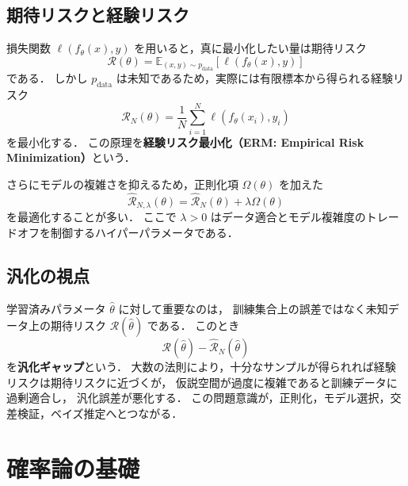 \subsection{期待リスクと経験リスク}

損失関数 $\ell(f_{\theta}(x), y)$ を用いると，真に最小化したい量は期待リスク
\begin{equation}
  \mathcal{R}(\theta)
  =
  \mathbb{E}_{(x,y)\sim p_{\mathrm{data}}}
  \left[
    \ell(f_{\theta}(x), y)
  \right]
  \label{eq:true-risk}
\end{equation}
である．
しかし $p_{\mathrm{data}}$ は未知であるため，実際には有限標本から得られる経験リスク
\begin{equation}
  \hat{\mathcal{R}}_{N}(\theta)
  =
  \frac{1}{N}
  \sum_{i=1}^{N}
  \ell(f_{\theta}(x_i), y_i)
  \label{eq:empirical-risk}
\end{equation}
を最小化する．
この原理を\textbf{経験リスク最小化（ERM: Empirical Risk Minimization）}という．

さらにモデルの複雑さを抑えるため，正則化項 $\Omega(\theta)$ を加えた
\begin{equation}
  \hat{\mathcal{R}}_{N,\lambda}(\theta)
  =
  \hat{\mathcal{R}}_{N}(\theta) + \lambda \Omega(\theta)
  \label{eq:regularized-risk}
\end{equation}
を最適化することが多い．
ここで $\lambda > 0$ はデータ適合とモデル複雑度のトレードオフを制御するハイパーパラメータである．

\subsection{汎化の視点}

学習済みパラメータ $\hat{\theta}$ に対して重要なのは，
訓練集合上の誤差ではなく未知データ上の期待リスク $\mathcal{R}(\hat{\theta})$ である．
このとき
\begin{equation}
  \mathcal{R}(\hat{\theta}) - \hat{\mathcal{R}}_{N}(\hat{\theta})
\end{equation}
を\textbf{汎化ギャップ}という．
大数の法則により，十分なサンプルが得られれば経験リスクは期待リスクに近づくが，
仮説空間が過度に複雑であると訓練データに過剰適合し，
汎化誤差が悪化する．
この問題意識が，正則化，モデル選択，交差検証，ベイズ推定へとつながる．

\section{確率論の基礎}
\label{sec:ml-probability}

